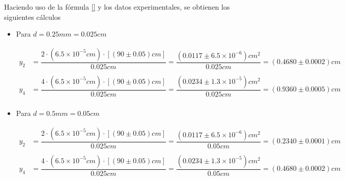 \documentclass[12pt,a4paper]{article}
\begin{document}
	Haciendo uso de la fórmula \ref{} y los datos experimentales, se obtienen los siguientes cálculos
	\begin{itemize}
		\item Para $ d=0.25mm=0.025cm $

		\begin{align*}
			y_2&=\dfrac{2\cdot (6.5\times10^{-5}cm)\cdot[(90\pm 0.05) cm]}{0.025 cm}=
			\dfrac{(0.0117\pm 6.5\times 10^{-6}) cm^2}{0.025 cm}=
			(0.4680\pm 0.0002)cm\\\\
			y_4&=\dfrac{4\cdot (6.5\times10^{-5}cm)\cdot[(90\pm 0.05) cm]}{0.025 cm}=
			\dfrac{(0.0234\pm1.3\times 10^{-5})cm^2}{0.025 cm}=
			(0.9360\pm0.0005)cm\\
		\end{align*}
	
		\item Para $ d=0.5mm=0.05cm $
		
		\begin{align*}
			y_2&=\dfrac{2\cdot (6.5\times10^{-5}cm)\cdot[(90\pm 0.05) cm]}{0.025 cm}=
			\dfrac{(0.0117\pm 6.5\times 10^{-6}) cm^2}{0.05 cm}=
			(0.2340\pm 0.0001)cm\\\\
			y_4&=\dfrac{4\cdot (6.5\times10^{-5}cm)\cdot[(90\pm 0.05) cm]}{0.025 cm}=
			\dfrac{(0.0234\pm1.3\times 10^{-5})cm^2}{0.05 cm}=
			(0.4680\pm0.0002)cm\\
		\end{align*}	
		 
	\end{itemize}
\end{document}
